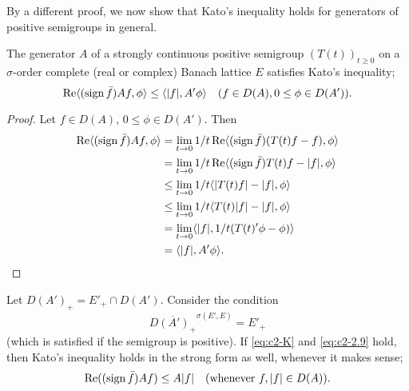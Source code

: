 By a different proof, we now show that Kato's inequality holds for generators of positive semigroups in general.
\begin{theorem}\label{thm:c2-2.4}
The generator $A$ of a strongly continuous positive semigroup $(T(t))_{t \geq 0}$ on a $\sigma$-order complete (real or complex) Banach lattice $E$ satisfies Kato's inequality; \ie
\begin{equation*}\label{eq:c2-K-2} %
\Re\langle(\sign \bar{f})Af,\phi \rangle \leq \langle |f|,A'\phi \rangle \quad (f \in D(A), 0 \leq \phi \in D(A'))  .
\end{equation*}
\end{theorem}
\begin{proof}
Let $f \in D(A)$, $0 \leq \phi \in D(A')$.
Then
\begin{align*}
\mathop{}\!\mathrm{Re}\langle(\operatorname{sign} \bar{f})Af, \phi \rangle 
	&= \lim_{t \to 0} 1/t \mathop{}\!\mathrm{Re}\langle(\operatorname{sign} \bar{f})(T(t)f - f), \phi \rangle \\
	&= \lim_{t \to 0} 1/t \mathop{}\!\mathrm{Re}\langle(\operatorname{sign} \bar{f})T(t)f - |f|, \phi \rangle \\
	&\leq \lim_{t \to 0} 1/t \langle |T(t)f| - |f|, \phi \rangle \\
	&\leq \lim_{t \to 0} 1/t \langle T(t)|f| - |f|, \phi \rangle\\
	&= \lim_{t \to 0} \langle |f|, 1/t(T(t)'\phi - \phi) \rangle\\
	&= \langle |f|, A'\phi \rangle.
\end{align*}
\end{proof}
Let $D(A')_{+} = E'_{+} \cap D(A')$. 
Consider the condition
\begin{equation}\label{eq:c2-2.9}
\overline{D(A')_{+}}^{\sigma(E',E)} = E'_{+}
\end{equation}
(which is satisfied if the semigroup is positive). 
If \eqref{eq:c2-K}   and \eqref{eq:c2-2.9}   hold, then Kato's inequality holds in the strong form as well, whenever it makes sense; \ie
\begin{equation}\label{eq:c2-2.10}
\mathop{}\!\mathrm{Re}((\operatorname{sign} \bar{f})Af) \leq A|f| \quad \text{(whenever } f, |f| \in D(A)\text{)}.
\end{equation}
